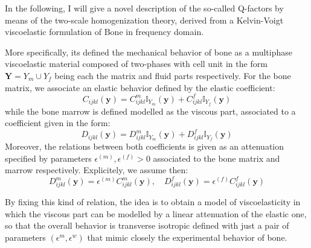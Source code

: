 In the following, I will give a novel description of the so-called Q-factors by means of the two-scale homogenization theory, derived from a Kelvin-Voigt viscoelastic formulation of Bone in frequency domain.

More specifically, its defined the mechanical behavior of bone as a multiphase viscoelastic material composed of two-phases with cell unit in the form $\mathbf{Y} = Y_{m} \cup Y_{f}$ being each the matrix and fluid parts respectively.
For the bone matrix, we associate an elastic behavior defined by the elastic coefficient:
\begin{equation*}
    C_{ijkl}(\mathbf{y}) = C_{ijkl}^m \mathbb{I}_{Y_m}(\mathbf{y}) + C_{ijkl}^f \mathbb{I}_{Y_f}(\mathbf{y})
\end{equation*}
while the bone marrow is defined modelled as the viscous part, associated to a coefficient given in the form:
\begin{equation*}
    D_{ijkl}(\mathbf{y}) =  D_{ijkl}^m \mathbb{I}_{Y_m}(\mathbf{y}) + D_{ijkl}^f \mathbb{I}_{Y_f}(\mathbf{y})
\end{equation*}
Moreover, the relations between both coefficients is given as an attenuation specified by parameters $\epsilon^{(m)}, \epsilon^{(f)} >0$ associated to the bone matrix and marrow respectively. Explicitely, we assume then:
\begin{equation*}
    D_{ijkl}^m(\mathbf{y}) = \epsilon^{(m)} C_{ijkl}^m(\mathbf{y}) , \quad D_{ijkl}^f (\mathbf{y}) = \epsilon^{(f)} C_{ijkl}^f(\mathbf{y})
\end{equation*}


\begin{rem}
By fixing this kind of relation, the idea is to obtain a model of viscoelasticity in which the viscous part can be modelled by a linear attenuation of the elastic one, so that the overall behavior is transverse isotropic defined with just a pair of parameters $(\epsilon^m, \epsilon^w)$ that mimic closely the experimental behavior of bone.
\end{rem}

